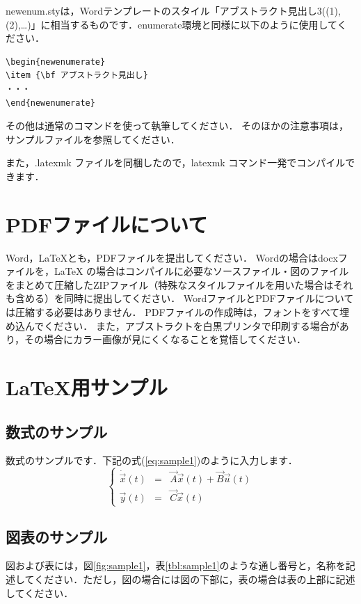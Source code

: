 \documentclass[a4paper, 9pt]{jarticle}
\begin{document}
\begin{論文概要}
newenum.styは，Wordテンプレートのスタイル「アブストラクト見出し3((1), (2),…)」に相当するものです．enumerate環境と同様に以下のように使用してください．
\begin{verbatim}
\begin{newenumerate}
\item {\bf アブストラクト見出し}
・・・
\end{newenumerate}
\end{verbatim}

その他は通常のコマンドを使って執筆してください．
そのほかの注意事項は，サンプルファイルを参照してください．

また，.latexmk ファイルを同梱したので，latexmk コマンド一発でコンパイルできます．

\section{PDFファイルについて}

Word，\LaTeX とも，PDFファイルを提出してください．
Wordの場合はdocxファイルを，\LaTeX
の場合はコンパイルに必要なソースファイル・図のファイルをまとめて圧縮したZIPファイル（特殊なスタイルファイルを用いた場合はそれも含める）を同時に提出してください．
WordファイルとPDFファイルについては圧縮する必要はありません．
PDFファイルの作成時は，フォントをすべて埋め込んでください．
また，アブストラクトを白黒プリンタで印刷する場合があり，その場合にカラー画像が見にくくなることを覚悟してください．


\section{\LaTeX 用サンプル}

\subsection{数式のサンプル}

数式のサンプルです．下記の式(\ref{eq:sample1})のように入力します．
\begin{equation}
\label{eq:sample1}
\left\{
\begin{array}{lcl}
\dot{\vec{x}}(t)&=&\vec{A}\vec{x}(t)+\vec{B}\vec{u}(t)\\
\vec{y}(t)&=&\vec{C}\vec{x}(t)
\end{array}
\right.
\end{equation}

\subsection{図表のサンプル}
図および表には，図\ref{fig:sample1}，表\ref{tbl:sample1}のような通し番号と，名称を記述してください．ただし，図の場合には図の下部に，表の場合は表の上部に記述してください．


\end{論文概要}
\end{document}
